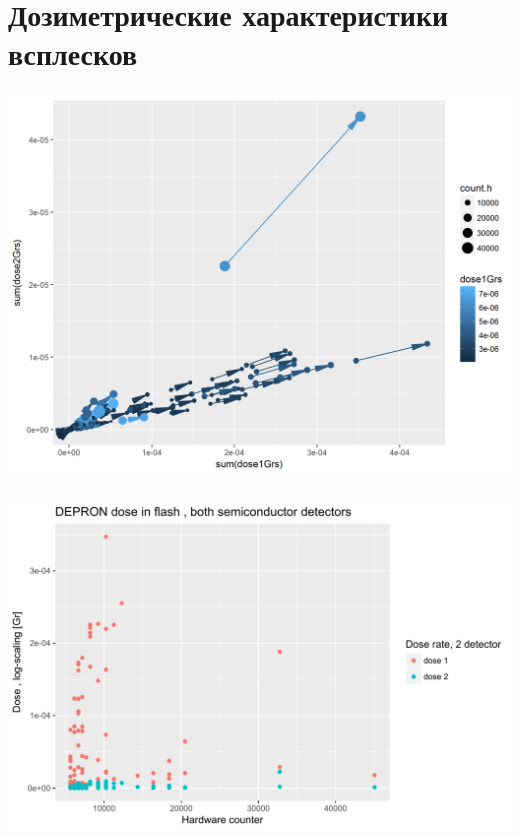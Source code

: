\documentclass[t, aspectratio=43]{beamer}
\begin{document}
\section{Дозиметрические характеристики всплесков}

\begin{frame}	
\frametitle{\insertsection} 
\begin{center}
	\includegraphics[width=0.9\linewidth]{images/dosenorm}
\end{center}


\end{frame}

\begin{frame}	
\frametitle{\insertsection} 
\begin{center}
	
	\includegraphics[width=.9\linewidth]{dosevscounth}
\end{center}

\end{frame}
\end{document}
